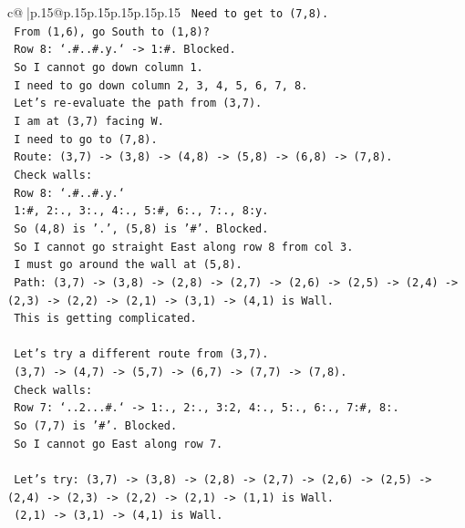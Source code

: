 \documentclass{article}
\begin{document}
{\begin{supertabular}{c@{$\;$}|p{.15\linewidth}@{}p{.15\linewidth}p{.15\linewidth}p{.15\linewidth}p{.15\linewidth}p{.15\linewidth}}
{{{\texttt{       Need to get to (7,8).} \\
\texttt{       From (1,6), go South to (1,8)?} \\
\texttt{       Row 8: `.\#..\#.y.` {-}> 1:\#. Blocked.} \\
\texttt{       So I cannot go down column 1.} \\
\texttt{       I need to go down column 2, 3, 4, 5, 6, 7, 8.} \\
\texttt{       Let's re{-}evaluate the path from (3,7).} \\
\texttt{       I am at (3,7) facing W.} \\
\texttt{       I need to go to (7,8).} \\
\texttt{       Route: (3,7) {-}> (3,8) {-}> (4,8) {-}> (5,8) {-}> (6,8) {-}> (7,8).} \\
\texttt{       Check walls:} \\
\texttt{       Row 8: `.\#..\#.y.`} \\
\texttt{       1:\#, 2:., 3:., 4:., 5:\#, 6:., 7:., 8:y.} \\
\texttt{       So (4,8) is '.', (5,8) is '\#'. Blocked.} \\
\texttt{       So I cannot go straight East along row 8 from col 3.} \\
\texttt{       I must go around the wall at (5,8).} \\
\texttt{       Path: (3,7) {-}> (3,8) {-}> (2,8) {-}> (2,7) {-}> (2,6) {-}> (2,5) {-}> (2,4) {-}> (2,3) {-}> (2,2) {-}> (2,1) {-}> (3,1) {-}> (4,1) is Wall.} \\
\texttt{       This is getting complicated.} \\
\\ 
\texttt{       Let's try a different route from (3,7).} \\
\texttt{       (3,7) {-}> (4,7) {-}> (5,7) {-}> (6,7) {-}> (7,7) {-}> (7,8).} \\
\texttt{       Check walls:} \\
\texttt{       Row 7: `..2...\#.` {-}> 1:., 2:., 3:2, 4:., 5:., 6:., 7:\#, 8:.} \\
\texttt{       So (7,7) is '\#'. Blocked.} \\
\texttt{       So I cannot go East along row 7.} \\
\\ 
\texttt{       Let's try: (3,7) {-}> (3,8) {-}> (2,8) {-}> (2,7) {-}> (2,6) {-}> (2,5) {-}> (2,4) {-}> (2,3) {-}> (2,2) {-}> (2,1) {-}> (1,1) is Wall.} \\
\texttt{       (2,1) {-}> (3,1) {-}> (4,1) is Wall.} \\
}}}
\end{supertabular}}
\end{document}
